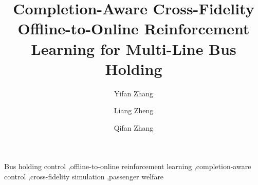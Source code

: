 \documentclass[preprint,12pt,authoryear,nopreprintline]{elsarticle}
\date{}
\begin{document}
\begin{frontmatter}

\title{Completion-Aware Cross-Fidelity Offline-to-Online Reinforcement Learning for Multi-Line Bus Holding}

\author[csu]{Yifan Zhang}
\author[csu]{Liang Zheng}
\author[monash]{Qifan Zhang}
\address[csu]{Central South University, Changsha, Hunan, China}
\address[monash]{Faculty of Information Technology, Monash University Malaysia, Malaysia}




\begin{keyword}
Bus holding control \sep offline-to-online reinforcement learning \sep completion-aware control \sep cross-fidelity simulation \sep passenger welfare
\end{keyword}

\end{frontmatter}










\clearpage
\appendix
\renewcommand{\thesubsection}{\Alph{section}.\arabic{subsection}}
\renewcommand{\theequation}{\Alph{section}.\arabic{equation}}
\renewcommand{\thetable}{\Alph{section}.\arabic{table}}
\renewcommand{\thefigure}{\Alph{section}.\arabic{figure}}





\end{document}
